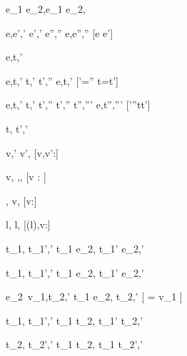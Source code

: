   { }
  {e_1 \Xor e_2,\sigma \stride e_1 \Xor e_2,\sigma}

    {e,\sigma \eval e',\sigma'  \Quad
     e',\sigma' \stride e'',\sigma''}
    {e,\sigma \stride e'',\sigma''}
    [e \neq e']



  {e,\sigma \normalise t,\sigma'}


    {e,\sigma \eval t,\sigma' \Quad
     t,\sigma' \stride t',\sigma''}
    {e,\sigma \normalise t,\sigma'}
    [\sigma'=\sigma'' \land t=t']

    {e,\sigma \eval t,\sigma'  \Quad
     t,\sigma' \stride t',\sigma''  \Quad
     t',\sigma'' \normalise t'',\sigma'''}
    {e,\sigma \normalise t'',\sigma'''}
    [\sigma'\neq \sigma''\vee t\neq t']




  {t,\sigma {} t',\sigma'}


  { }
  {\Edit v,\sigma {}' \Edit v',\sigma}
  [v,v':\tau]

  { }
  {\Edit v,\sigma \handle{\Empty} \Enter \tau,\sigma,\True}
  [v : \tau]

  { }
  {\Enter \tau,\sigma {} \Edit v,\sigma}
  [v:\tau]

  { }
  {\Update l,\sigma {} \Update l,\sigma[l \mapsto v]}
  [\sigma(l),v:\tau]

  {t_1,\sigma {} t_1',\sigma'}
  {t_1 \Then e_2,\sigma {} t_1' \Then e_2,\sigma'}

  {t_1,\sigma {} t_1',\sigma'}
  {t_1 \Next e_2,\sigma {} t_1' \Next e_2,\sigma'}

  {e_2\ v_1,\sigma \normalise t_2,\sigma'}
  {t_1 \Next e_2,\sigma \xrightarrow[]{\Continue} t_2,\sigma'}
  [ = v_1 \land \neg{}]


  {t_1,\sigma {} t_1',\sigma'}
  {t_1 \And t_2,\sigma {} t_1' \And t_2,\sigma'}

  {t_2,\sigma {} t_2',\sigma'}
  {t_1 \And t_2,\sigma {} t_1 \And t_2',\sigma'}


